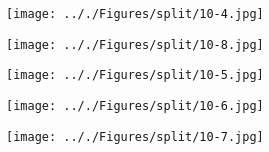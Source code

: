 \documentclass[onecolumn,11pt]{report}
\def\lthtmlcheckvsize{\ifdim\ht\sizebox<\vsize 
  \ifdim\wd\sizebox<\hsize\expandafter\hfill\fi \expandafter\vfill
  \else\expandafter\vss\fi}%
\begin{document}
{\newpage\clearpage
{}%
\texttt{[image: .././Figures/split/10-4.jpg]}%
\lthtmlpictureZ
\lthtmlcheckvsize\clearpage}

{\newpage\clearpage
{}%
\texttt{[image: .././Figures/split/10-8.jpg]}%
\lthtmlpictureZ
\lthtmlcheckvsize\clearpage}

{\newpage\clearpage
{}%
\texttt{[image: .././Figures/split/10-5.jpg]}%
\lthtmlpictureZ
\lthtmlcheckvsize\clearpage}

{\newpage\clearpage
{}%
\texttt{[image: .././Figures/split/10-6.jpg]}%
\lthtmlpictureZ
\lthtmlcheckvsize\clearpage}

{\newpage\clearpage
{}%
\texttt{[image: .././Figures/split/10-7.jpg]}%
\lthtmlpictureZ
\lthtmlcheckvsize\clearpage}

\end{document}
